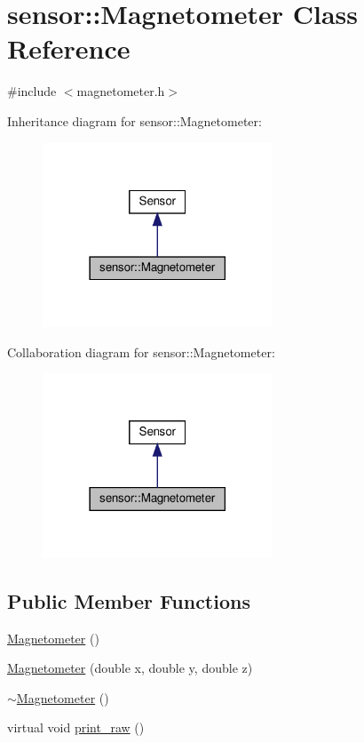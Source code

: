 \hypertarget{classsensor_1_1_magnetometer}{}\section{sensor\+:\+:Magnetometer Class Reference}
\label{classsensor_1_1_magnetometer}


{\ttfamily \#include $<$magnetometer.\+h$>$}



Inheritance diagram for sensor\+:\+:Magnetometer\+:\nopagebreak
\begin{figure}[H]
\begin{center}
\leavevmode
\includegraphics[width=194pt]{classsensor_1_1_magnetometer__inherit__graph}
\end{center}
\end{figure}


Collaboration diagram for sensor\+:\+:Magnetometer\+:\nopagebreak
\begin{figure}[H]
\begin{center}
\leavevmode
\includegraphics[width=194pt]{classsensor_1_1_magnetometer__coll__graph}
\end{center}
\end{figure}
\subsection*{Public Member Functions}
\begin{DoxyCompactItemize}
\item 
\hyperlink{classsensor_1_1_magnetometer_a09d5d8674a21e70460745081ac759d87}{Magnetometer} ()
\item 
\hyperlink{classsensor_1_1_magnetometer_a30b9846b3bbecf844e10845f47ff0bf5}{Magnetometer} (double x, double y, double z)
\item 
\hyperlink{classsensor_1_1_magnetometer_acaebbf476faf2f2e029e9d4e5d1ff896}{$\sim$\+Magnetometer} ()
\item 
virtual void \hyperlink{classsensor_1_1_magnetometer_a808eda46aabd080426c909563da0f425}{print\+\_\+raw} ()
\end{DoxyCompactItemize}
